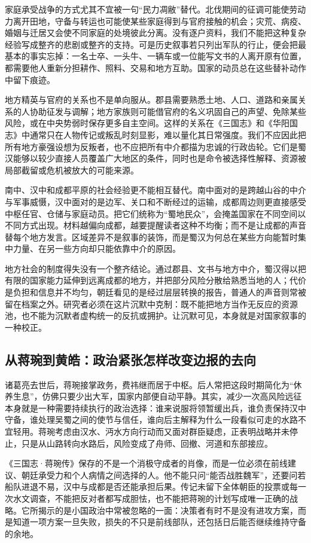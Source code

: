 家庭承受战争的方式尤其不宜被一句“民力凋敝”替代。北伐期间的征调可能使劳动力离开田地，守备与转运也可能使某些家庭得到与官府接触的机会；灾荒、病疫、婚姻与迁居又会使不同家庭的处境彼此分离。没有逐户资料，我们不能把这种复杂经验写成整齐的悲剧或整齐的支持。可是历史叙事若只列出军队的行止，便会把最基本的事实忘掉：一名士卒、一头牛、一辆车或一位能写文书的人离开原有位置，都需要他人重新分担耕作、照料、交易和地方互助。国家的动员总在这些替补动作中留下痕迹。

地方精英与官府的关系也不是单向服从。郡县需要熟悉土地、人口、道路和亲属关系的人协助征发与调解；地方家族则可能借官府的名义巩固自己的声望、免除某些风险，或在中央势弱时保存更多自主空间。这样的关系在《三国志》和《华阳国志》中通常只在人物传记或叛乱时刻显影，难以量化其日常强度。我们不应因此把所有地方豪强设想为反叛者，也不应把所有中介都描为忠诚的行政齿轮。它们是蜀汉能够以较少直接人员覆盖广大地区的条件，同时也是命令被选择性解释、资源被局部截留或危机被放大的可能来源。

南中、汉中和成都平原的社会经验更不能相互替代。南中面对的是跨越山谷的中介与军事威慑，汉中面对的是边军、关口和不断经过的运输，成都周边则更直接感受中枢任官、仓储与家庭动员。把它们统称为“蜀地民众”，会掩盖国家在不同空间以不同方式出现。材料越偏向成都，越要提醒读者这种不均衡；而不是让成都的声音替每个地方发言。区域差异不是叙事的装饰，而是蜀汉为何总在某些方向能暂时集中力量、在另一些方向却只能依靠中介的原因。

地方社会的制度得失没有一个整齐结论。通过郡县、文书与地方中介，蜀汉得以把有限的国家能力延伸到远离成都的地方，并把部分风险分散给熟悉当地的人；代价是负担和信息并不均匀，朝廷看见的是经过层层转换的报告，普通人的声音则常被留在档案之外。研究者必须在这片沉默中克制：既不能把地方当作无反应的资源池，也不能为沉默者虚构统一的反抗或拥护。让沉默可见，本身就是对国家叙事的一种校正。

\subsection{从蒋琬到黄皓：政治紧张怎样改变边报的去向}

诸葛亮去世后，蒋琬接掌政务，费祎继而居于中枢。后人常把这段时期简化为“休养生息”，仿佛只要少出大军，国家内部便自动平静。其实，减少一次高风险远征本身就是一种需要持续执行的政治选择：谁来说服将领暂缓出兵，谁负责保持汉中守备，谁处理吴蜀之间的使节与信任，谁向后主解释为什么一段看似可走的水路不宜轻用。蒋琬考虑由汉水、沔水方向行动而又面对群臣疑虑，正表明战略并未停止，只是从山路转向水路后，风险变成了舟师、回撤、河道和东部接应。

《三国志·蒋琬传》保存的不是一个消极守成者的肖像，而是一位必须在前线建议、朝廷承受力和个人病情之间选择的人。他不能只问“能否战胜魏军”，还要问若船队进退不易，汉中与成都是否还能承担后果。传记未留下全体朝臣的投票或每一次水文调查，不能把反对者都写成胆怯，也不能把蒋琬的计划写成唯一正确的战略。它所揭示的是小国政治中常被忽略的一面：决策者有时不是没有进攻方案，而是知道一项方案一旦失败，损失的不只是前线部队，还包括日后能否继续维持守备的余地。

